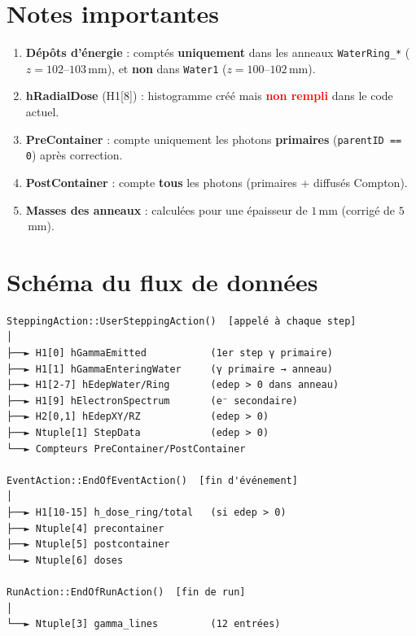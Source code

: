 \documentclass[11pt,a4paper]{article}
\newcommand{\code}[1]{\texttt{#1}}
\newcommand{\unit}[1]{\ensuremath{\,\mathrm{#1}}}
\begin{document}
\section{Notes importantes}

\begin{enumerate}
    \item \textbf{Dépôts d'énergie} : comptés \textbf{uniquement} dans les anneaux \code{WaterRing\_*} ($z = 102$--$103$\unit{mm}), et \textbf{non} dans \code{Water1} ($z = 100$--$102$\unit{mm}).
    
    \item \textbf{hRadialDose} (H1[8]) : histogramme créé mais \textcolor{red}{\textbf{non rempli}} dans le code actuel.
    
    \item \textbf{PreContainer} : compte uniquement les photons \textbf{primaires} (\code{parentID == 0}) après correction.
    
    \item \textbf{PostContainer} : compte \textbf{tous} les photons (primaires + diffusés Compton).
    
    \item \textbf{Masses des anneaux} : calculées pour une épaisseur de $1$\unit{mm} (corrigé de $5$\unit{mm}).
\end{enumerate}

\section{Schéma du flux de données}

\begin{verbatim}
SteppingAction::UserSteppingAction()  [appelé à chaque step]
│
├──► H1[0] hGammaEmitted           (1er step γ primaire)
├──► H1[1] hGammaEnteringWater     (γ primaire → anneau)
├──► H1[2-7] hEdepWater/Ring       (edep > 0 dans anneau)
├──► H1[9] hElectronSpectrum       (e⁻ secondaire)
├──► H2[0,1] hEdepXY/RZ            (edep > 0)
├──► Ntuple[1] StepData            (edep > 0)
└──► Compteurs PreContainer/PostContainer

EventAction::EndOfEventAction()  [fin d'événement]
│
├──► H1[10-15] h_dose_ring/total   (si edep > 0)
├──► Ntuple[4] precontainer
├──► Ntuple[5] postcontainer
└──► Ntuple[6] doses

RunAction::EndOfRunAction()  [fin de run]
│
└──► Ntuple[3] gamma_lines         (12 entrées)
\end{verbatim}
\end{document}
